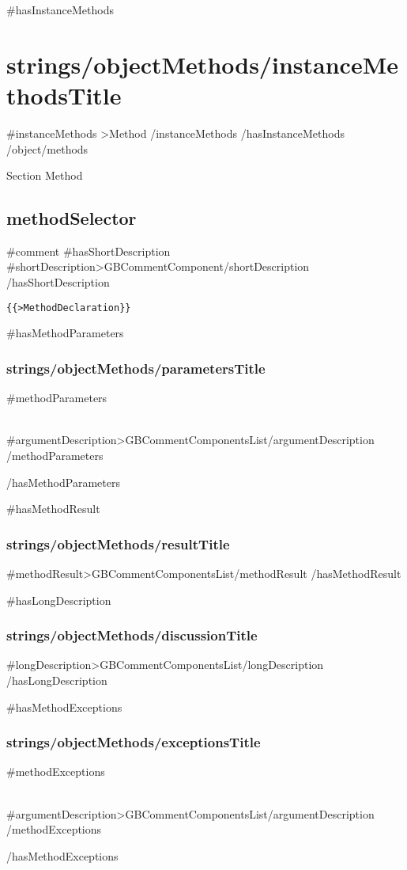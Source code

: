 {{#hasInstanceMethods}}
\section{{{strings/objectMethods/instanceMethodsTitle}}}
\label{api/objects/{{page/title}}/InstanceMethods}
{{#instanceMethods}}
	{{>Method}}
{{/instanceMethods}}
{{/hasInstanceMethods}}
{{/object/methods}}


Section Method
\subsection{{{methodSelector}}}
\label{{{htmlReferenceName}}}
{{#comment}}
{{#hasShortDescription}}
	{{#shortDescription}}{{>GBCommentComponent}}{{/shortDescription}}
{{/hasShortDescription}}

\begin{verbatim}
{{>MethodDeclaration}}
\end{verbatim}

{{#hasMethodParameters}}
\subsubsection{{{strings/objectMethods/parametersTitle}}}
\begin{description}
{{#methodParameters}}
	\item[\parameter{{{argumentName}}}] \hfill \\  {{#argumentDescription}}{{>GBCommentComponentsList}}{{/argumentDescription}}
{{/methodParameters}}
\end{description}
{{/hasMethodParameters}}
	
{{#hasMethodResult}}
\subsubsection{{{strings/objectMethods/resultTitle}}}
	{{#methodResult}}{{>GBCommentComponentsList}}{{/methodResult}}
{{/hasMethodResult}}
	
{{#hasLongDescription}}
\subsubsection{{{strings/objectMethods/discussionTitle}}}
	{{#longDescription}}{{>GBCommentComponentsList}}{{/longDescription}}
{{/hasLongDescription}}
	
{{#hasMethodExceptions}}
\subsubsection{{{strings/objectMethods/exceptionsTitle}}}
\begin{description}
{{#methodExceptions}}
	\item[\exception{{{argumentName}}}]\hfill \\  {{#argumentDescription}}{{>GBCommentComponentsList}}{{/argumentDescription}}
{{/methodExceptions}}
\end{description}
{{/hasMethodExceptions}}
	
